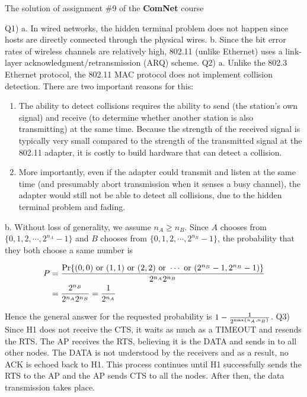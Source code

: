 \documentclass[10pt,letterpaper]{article}
\newcommand{\eqn}[2]{
\begin{equation}
\begin{split}
#1
\label{#2}
\end{split}
\end{equation}
}
\begin{document}
\Large
\begin{center}
The solution of assignment \#9 of the \textbf{ComNet} course
\end{center}
Q1) a. In wired networks, the hidden terminal problem does not happen since hosts are directly connected through the physical wires.
\newline\newline
b. Since the bit error rates of wireless channels are relatively high,
802.11 (unlike Ethernet) uses a link-layer acknowledgment/retransmission (ARQ) scheme.
\newline\newline
Q2) a. Unlike the
802.3 Ethernet protocol, the 802.11 MAC protocol does not implement collision
detection. There are two important reasons for this:
\begin{enumerate}
\item
The ability to detect collisions requires the ability to send (the station’s own signal)
and receive (to determine whether another station is also transmitting) at the
same time. Because the strength of the received signal is typically very small
compared to the strength of the transmitted signal at the 802.11 adapter, it is
costly to build hardware that can detect a collision.
\item
More importantly, even if the adapter could transmit and listen at the same time
(and presumably abort transmission when it senses a busy channel), the adapter
would still not be able to detect all collisions, due to the hidden terminal problem
and fading.
\end{enumerate}
b. Without loss of generality, we assume $n_A\ge n_B$. Since $A$ chooses from $\{0,1,2,\cdots , 2^{n_A}-1\}$ and $B$ chooses from $\{0,1,2,\cdots , 2^{n_B}-1\}$, the probability that they both choose a same number is
\eqn{
P&={\Pr\{(0,0)\text{ or }(1,1)\text{ or }(2,2)\text{ or }\cdots \text{ or }(2^{n_B}-1,2^{n_B}-1)\}\over 2^{n_A}2^{n_B}}
\\&={2^{n_B}\over 2^{n_A}2^{n_B}}={1\over 2^{n_A}}
}{}
Hence the general answer for the requested probability is $1-{1\over 2^{\max\{n_A,n_B\}}}$.
\newline\newline
Q3) Since H1 does not receive the CTS, it waits as much as a TIMEOUT and resends the RTS. The AP receives the RTS, believing it is the DATA and sends in to all other nodes. The DATA is not understood by the receivers and as a result, no ACK is echoed back to H1. This process continues until H1 successfully sends the RTS to the AP and the AP sends CTS to all the nodes. After then, the data transmission takes place.
\end{document}
